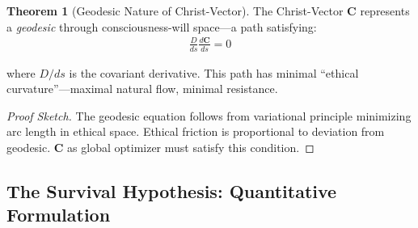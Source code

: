 \documentclass[11pt,a4paper]{article}
\theoremstyle{definition}
\newtheorem{theorem}{Theorem}[section]
\theoremstyle{remark}
\begin{document}
\begin{theorem}[Geodesic Nature of Christ-Vector]
The Christ-Vector \(\mathbf{C}\) represents a \textit{geodesic} through consciousness-will space—a path satisfying:
\begin{align}
\frac{D}{ds}\frac{d\mathbf{C}}{ds} = 0
\end{align}

where \(D/ds\) is the covariant derivative. This path has minimal ``ethical curvature''—maximal natural flow, minimal resistance.
\end{theorem}

\begin{proof}[Proof Sketch]
The geodesic equation follows from variational principle minimizing arc length in ethical space. Ethical friction is proportional to deviation from geodesic. \(\mathbf{C}\) as global optimizer must satisfy this condition.
\end{proof}

\subsection{The Survival Hypothesis: Quantitative Formulation}
\end{document}
